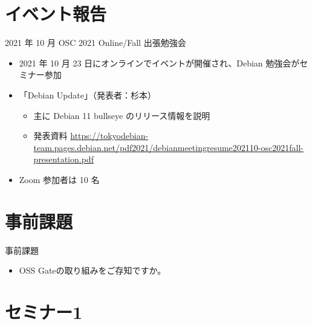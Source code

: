 \section{イベント報告}

\begin{frame}{2021 年 10 月 OSC 2021 Online/Fall 出張勉強会}
\begin{itemize}
\item 2021 年 10 月 23 日にオンラインでイベントが開催され、Debian 勉強会がセミナー参加
\item 「Debian Update」（発表者：杉本）
  \begin{itemize}
  \item 主に Debian 11 bullseye のリリース情報を説明
  \item 発表資料 \url{https://tokyodebian-team.pages.debian.net/pdf2021/debianmeetingresume202110-osc2021fall-presentation.pdf}
  \end{itemize}
\item Zoom 参加者は 10 名
\end{itemize}
\end{frame}

\section{事前課題}

\begin{frame}{事前課題}
  \begin{itemize}
  \item OSS Gateの取り組みをご存知ですか。
  \end{itemize}
\end{frame}

{\footnotesize
  
}

%

\section{セミナー1}


